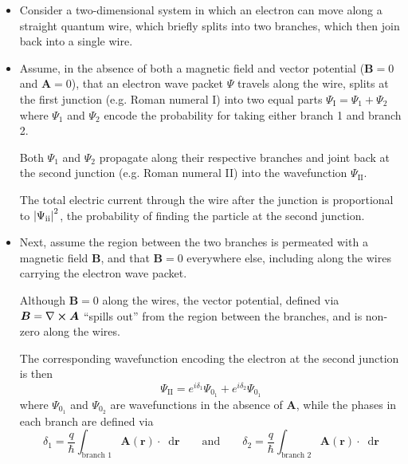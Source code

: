 \documentclass[11pt, a4paper]{article}
\newcommand{\diff}{\mathop{}\!\mathrm{d}} %
\renewcommand{\curl}{\nabla \cross}
\newcommand{\eqtext}[1]{\qquad \text{#1} \qquad}
\renewcommand{\vec}[1]{\bm{#1}}  %
\renewcommand{\r}{\vec{r}}  %
\newcommand{\A}{\vec{A}}  %
\newcommand{\B}{\vec{B}}  %
\renewcommand{\P}{\Psi}  %
\begin{document}
\begin{itemize}
	\item Consider a two-dimensional system in which an electron can move along a straight quantum wire, which briefly splits into two branches, which then join back into a single wire.
	
	\item Assume, in the absence of both a magnetic field and vector potential ($ \B = 0 $ and $ \A = 0 $), that an electron wave packet $ \P $ travels along the wire, splits at the first junction (e.g. Roman numeral I) into two equal parts $ \P_{\text{I}} = \P_{1} + \P_{2} $ where $ \P_{1} $ and $ \P_{2} $ encode the probability for taking either branch 1 and branch 2.
	
	Both $ \P_{1} $ and $ \P_{2} $ propagate along their respective branches and joint back at the second junction (e.g. Roman numeral II) into the wavefunction $ \P_{\text{II}} $.
	
	The total electric current through the wire after the junction is proportional to $ \abs{\P_{\text{ii}}}^{2} $, the probability of finding the particle at the second junction.
	
	\item Next, assume the region between the two branches is permeated with a magnetic field $ \B $, and that $ \B = 0 $ everywhere else, including along the wires carrying the electron wave packet. 
	
	Although $ \B = 0 $ along the wires, the vector potential, defined via $ \B = \curl \A $ ``spills out'' from the region between the branches, and is non-zero along the wires. 
	
	The corresponding wavefunction encoding the electron at the second junction is then
	\begin{equation*}
		\P_{\text{II}} = e^{i\delta_{1}} \P_{0_{1}} + e^{i\delta_{2}}\P_{0_{1}}
	\end{equation*}
	where $ \P_{0_{1}} $ and $ \P_{0_{2}} $ are wavefunctions in the absence of $ \A $, while the phases in each branch are defined via
	\begin{equation*}
		\delta_{1} = \frac{q}{\hbar} \int_{\text{branch 1}} \A(\r) \cdot \diff \r \eqtext{and} \delta_{2} = \frac{q}{\hbar} \int_{\text{branch 2}} \A(\r) \cdot \diff \r
	\end{equation*}
	

\end{itemize}
\end{document}
